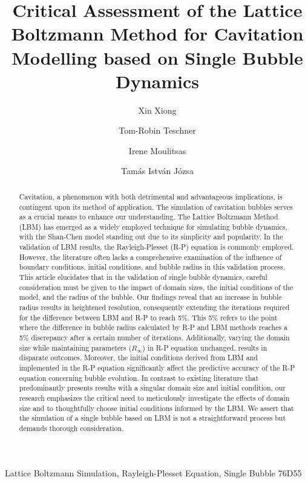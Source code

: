\documentclass[review]{elsarticle}
\begin{document}
\newlength\figureheight
\newlength\figurewidth
\begin{frontmatter}

\title{Critical Assessment of the Lattice Boltzmann Method for Cavitation Modelling based on Single Bubble Dynamics}
\author[address_1]{Xin Xiong}
\author[address_1]{Tom-Robin Teschner}
\author[address_1]{Irene Moulitsas}
\author[address_1]{Tam\'{a}s Istv\'{a}n J\'{o}zsa}


\address[address_1] { Centre for Computational Engineering Sciences, Cranfield University, Cranfield MK43 0AL, UK.}

\begin{abstract}
Cavitation, a phenomenon with both detrimental and advantageous implications, is contingent upon its method of application. The simulation of cavitation bubbles serves as a crucial means to enhance our understanding. The Lattice Boltzmann Method (LBM) has emerged as a widely employed technique for simulating bubble dynamics, with the Shan-Chen model standing out due to its simplicity and popularity. In the validation of LBM results, the Rayleigh-Plesset (R-P) equation is commonly employed. However, the literature often lacks a comprehensive examination of the influence of boundary conditions, initial conditions, and bubble radius in this validation process.
This article elucidates that in the validation of single bubble dynamics, careful consideration must be given to the impact of domain sizes, the initial conditions of the model, and the radius of the bubble. Our findings reveal that an increase in bubble radius results in heightened resolution, consequently extending the iterations required for the difference between LBM and R-P to reach 5\%. This 5\% refers to the point where the difference in bubble radius calculated by R-P and LBM methods reaches a 5\% discrepancy after a certain number of iterations. Additionally, varying the domain size while maintaining parameters ($R_{\infty}$) in R-P equation unchanged, results in disparate outcomes. Moreover, the initial conditions derived from LBM and implemented in the R-P equation significantly affect the predictive accuracy of the R-P equation concerning bubble evolution.
In contrast to existing literature that predominantly presents results with a singular domain size and initial condition, our research emphasizes the critical need to meticulously investigate the effects of domain size and to thoughtfully choose initial conditions informed by the LBM. We assert that the simulation of a single bubble based on LBM is not a straightforward process but demands thorough consideration.
\end{abstract}

\begin{keyword}
Lattice Boltzmann Simulation, Rayleigh-Plesset Equation, Single Bubble
\MSC[2010] 76D55
\end{keyword}


\end{frontmatter}
\end{document}
